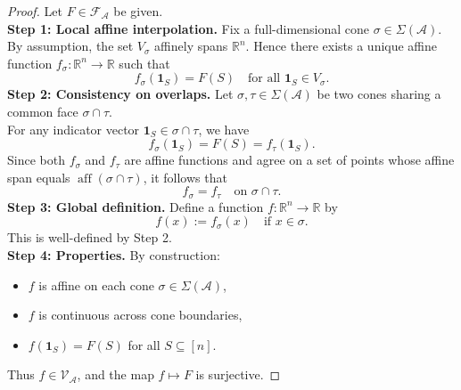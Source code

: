 \documentclass[10pt,a4paper]{amsart}
\begin{document}
\begin{proof}
Let $F \in \mathcal{F}_{\mathcal{A}}$ be given.\\
\noindent
\textbf{Step 1: Local affine interpolation.}
Fix a full-dimensional cone $\sigma \in \Sigma(\mathcal{A})$. By assumption, the set $V_\sigma$ affinely spans $\mathbb{R}^n$. Hence there exists a unique affine function $f_\sigma : \mathbb{R}^n \to \mathbb{R}$ such that
\[
f_\sigma(\mathbf{1}_S) = F(S) \quad \text{for all } \mathbf{1}_S \in V_\sigma.
\]
\noindent
\textbf{Step 2: Consistency on overlaps.}
Let $\sigma, \tau \in \Sigma(\mathcal{A})$ be two cones sharing a common face $\sigma \cap \tau$. \\
\noindent
For any indicator vector $\mathbf{1}_S \in \sigma \cap \tau$, we have
\[
f_\sigma(\mathbf{1}_S) = F(S) = f_\tau(\mathbf{1}_S).
\]
\noindent
Since both $f_\sigma$ and $f_\tau$ are affine functions and agree on a set of points whose affine span equals $\operatorname{aff}(\sigma \cap \tau)$, it follows that
\[
f_\sigma = f_\tau \quad \text{on } \sigma \cap \tau.
\]
\noindent
\textbf{Step 3: Global definition.}
Define a function $f : \mathbb{R}^n \to \mathbb{R}$ by
\[
f(x) := f_\sigma(x) \quad \text{if } x \in \sigma.
\]
\noindent
This is well-defined by Step 2.\\
\noindent
\textbf{Step 4: Properties.}
By construction:
\begin{itemize}
\item $f$ is affine on each cone $\sigma \in \Sigma(\mathcal{A})$,
\item $f$ is continuous across cone boundaries,
\item $f(\mathbf{1}_S) = F(S)$ for all $S \subseteq [n]$.
\end{itemize}

Thus $f \in \mathcal{V}_{\mathcal{A}}$, and the map $f \mapsto F$ is surjective.
\end{proof}
\end{document}
